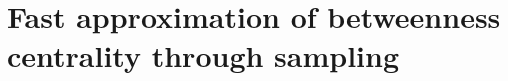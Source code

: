 \chapter{Fast approximation of betweenness centrality through sampling}\label{ch:graphmine}
%









